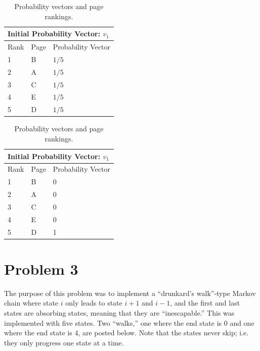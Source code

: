\documentclass{article}
\begin{document}
\begin{table}[H]
    \begin{tabular}{|l|l|l|}
        \hline
        \multicolumn{3}{|l|}{Initial Probability Vector: \(v_1\)} \\ \hline
        Rank & Page & Probability Vector \\ \hline
        1 & B & \(1/5\) \\ \hline
        2 & A & \(1/5\) \\ \hline
        3 & C & \(1/5\) \\ \hline
        4 & E & \(1/5\) \\ \hline
        5 & D & \(1/5\) \\ \hline
    \end{tabular}
    \begin{tabular}{|l|l|l|}
        \hline
        \multicolumn{3}{|l|}{Initial Probability Vector: \(v_1\)} \\ \hline
        Rank & Page & Probability Vector \\ \hline
        1 & B & 0 \\ \hline
        2 & A & 0 \\ \hline
        3 & C & 0 \\ \hline
        4 & E & 0 \\ \hline
        5 & D & 1 \\ \hline
    \end{tabular}
    \caption{Probability vectors and page rankings.}
    \label{p2 table}
\end{table}

\section{Problem 3}
The purpose of this problem was to implement a ``drunkard's
walk''-type Markov chain where state \(i\) only leads to
state \(i+1\) and \(i-1\), and the first and last states
are absorbing states, meaning that they are ``inescapable.''
This was implemented with five states. Two ``walks,'' one
where the end state is 0 and one where the end state is 4,
are posted below. Note that the states never skip; i.e. they
only progress one state at a time.
\end{document}
